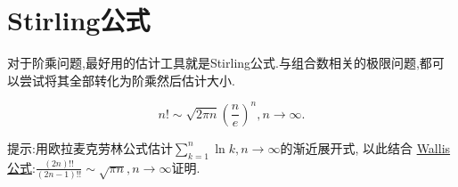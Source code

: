 \documentclass[../../main.tex]{subfiles}
\begin{document}
\section{Stirling公式}

对于阶乘问题,最好用的估计工具就是Stirling公式.与组合数相关的极限问题,都可以尝试将其全部转化为阶乘然后估计大小.

\begin{theorem}[Stirling公式]\label{theorem:Stirling公式}
\[
n!\sim\sqrt{2\pi n}\left(\frac{n}{e}\right)^{n},n\to\infty.
\]
\end{theorem}
\begin{note}
提示:用欧拉麦克劳林公式估计\(\sum_{k = 1}^{n}\ln k,n\to\infty\)的渐近展开式, 以此结合 \hyperref[theorem:Wallis公式]{Wallis 公式}:\(\frac{(2n)!!}{(2n - 1)!!}\sim\sqrt{\pi n},n\to\infty\)证明.
\end{note}
\end{document}
